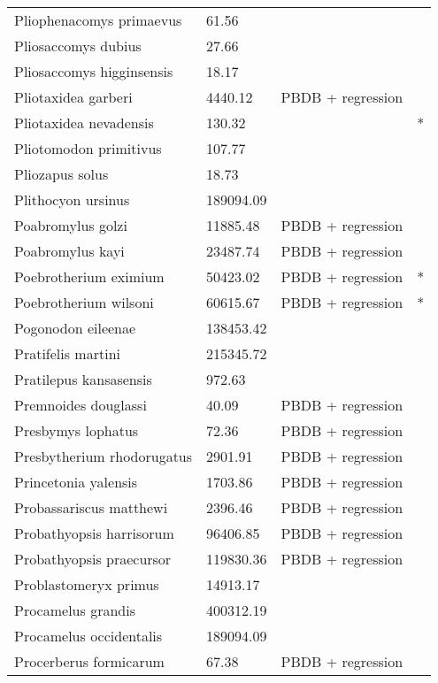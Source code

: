 \documentclass{article}
\begin{document}
\begin{center}
\begin{longtable}{p{} p{} p{} p{}}
    Pliophenacomys primaevus & 61.56 & \cite{Tomiya2013} &  \\ 
    Pliosaccomys dubius & 27.66 & \cite{Tomiya2013} &  \\ 
    Pliosaccomys higginsensis & 18.17 & \cite{Tomiya2013} &  \\ 
    Pliotaxidea garberi & 4440.12 & PBDB + regression &  \\ 
    Pliotaxidea nevadensis & 130.32 & \cite{Tomiya2013} & * \\ 
    Pliotomodon primitivus & 107.77 & \cite{Tomiya2013} &  \\ 
    Pliozapus solus & 18.73 & \cite{Tomiya2013} &  \\ 
    Plithocyon ursinus & 189094.09 & \cite{Tomiya2013} &  \\ 
    Poabromylus golzi & 11885.48 & PBDB + regression &  \\ 
    Poabromylus kayi & 23487.74 & PBDB + regression &  \\ 
    Poebrotherium eximium & 50423.02 & PBDB + regression & * \\ 
    Poebrotherium wilsoni & 60615.67 & PBDB + regression & * \\ 
    Pogonodon eileenae & 138453.42 & \cite{Fox2011b} &  \\ 
    Pratifelis martini & 215345.72 & \cite{Tomiya2013} &  \\ 
    Pratilepus kansasensis & 972.63 & \cite{Tomiya2013} &  \\ 
    Premnoides douglassi & 40.09 & PBDB + regression &  \\ 
    Presbymys lophatus & 72.36 & PBDB + regression &  \\ 
    Presbytherium rhodorugatus & 2901.91 & PBDB + regression &  \\ 
    Princetonia yalensis & 1703.86 & PBDB + regression &  \\ 
    Probassariscus matthewi & 2396.46 & PBDB + regression &  \\ 
    Probathyopsis harrisorum & 96406.85 & PBDB + regression &  \\ 
    Probathyopsis praecursor & 119830.36 & PBDB + regression &  \\ 
    Problastomeryx primus & 14913.17 & \cite{Tomiya2013} &  \\ 
    Procamelus grandis & 400312.19 & \cite{Tomiya2013} &  \\ 
    Procamelus occidentalis & 189094.09 & \cite{Tomiya2013} &  \\ 
    Procerberus formicarum & 67.38 & PBDB + regression &  \\ 

\end{longtable}
\end{center}
\end{document}
